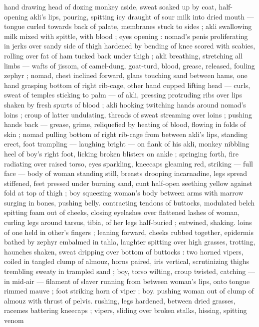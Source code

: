 hand drawing head of dozing monkey aside, sweat soaked up by 
coat, half-opening akli's lips, pouring, spitting icy draught of sour 
milk into dried mouth --- tongue curled towards back of palate, 
membranes stuck to sides ; akli swallowing milk mixed with spittle, 
with blood ; eyes opening : nomad's penis proliferating in jerks over 
sandy side of thigh hardened by bending of knee scored with 
scabies, rolling over fat of ham tucked back under thigh ; akli 
breathing, stretching all limbs --- wafts of jissom, of camel-dung, 
goat-turd, blood, grease, released, fouling zephyr ; nomad, chest 
inclined forward, glans touching sand between hams, one hand 
grasping bottom of right rib-cage, other hand cupped lifting head --- 
curls, sweat of temples sticking to palm --- of akli, pressing 
protruding ribs over lips shaken by fresh spurts of blood ; akli 
hooking twitching hands around nomad's loins ; croup of latter 
undulating, threads of sweat streaming over loins ; pushing hands 
back --- grease, grime, reliquefied by heating of blood, flowing in 
folds of skin ; nomad pulling bottom of right rib-cage from between 
akli's lips, standing erect, foot trampling --- laughing bright --- on 
flank of his akli, monkey nibbling heel of boy's right foot, licking 
broken blisters on ankle ; springing forth, fire radiating over raised 
torso, eyes sparkling, kneecaps gleaming red, striking --- full face 
--- body of woman standing still, breasts drooping incarnadine, legs 
spread stiffened, feet pressed under burning sand, cunt half-open 
seething yellow against fold at top of thigh ; boy squeezing woman's 
body between arms with marrow surging in bones, pushing belly. 
contracting tendons of buttocks, modulated belch spitting foam out 
of cheeks, closing eyelashes over flattened lashes of woman, curling 
legs around tarsus, tibia, of her legs half-buried ; entwined, shaking. 
loins of one held in other's fingers ; leaning forward, cheeks rubbed 
together, epidermis bathed by zephyr embalmed in tahla, laughter 
spitting over high grasses, trotting, haunches shaken, sweat dripping 
over bottom of buttocks : two horned vipers, coiled in tangled clump 
of almouz, horns paired, iris vertical, scrutinizing thighs trembling 
sweaty in trampled sand ; boy, torso wilting, croup twisted, catching 
--- in mid-air --- filament of slaver running from between woman's 
lips, onto tongue rimmed mauve ; foot striking horn of viper ; boy. 
pushing woman out of clump of almouz with thrust of pelvis. 
rushing, legs hardened, between dried grasses, racemes battering 
kneecaps ; vipers, sliding over broken stalks, hissing, spitting venom 
